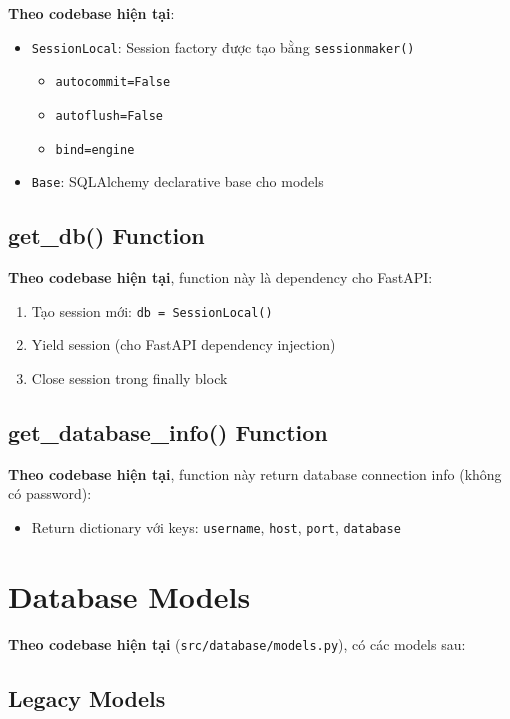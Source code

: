 \textbf{Theo codebase hiện tại}:
\begin{itemize}
    \item \texttt{SessionLocal}: Session factory được tạo bằng \texttt{sessionmaker()}
    \begin{itemize}
        \item \texttt{autocommit=False}
        \item \texttt{autoflush=False}
        \item \texttt{bind=engine}
    \end{itemize}
    \item \texttt{Base}: SQLAlchemy declarative base cho models
\end{itemize}

\subsection{get\_db() Function}

\textbf{Theo codebase hiện tại}, function này là dependency cho FastAPI:
\begin{enumerate}
    \item Tạo session mới: \texttt{db = SessionLocal()}
    \item Yield session (cho FastAPI dependency injection)
    \item Close session trong finally block
\end{enumerate}

\subsection{get\_database\_info() Function}

\textbf{Theo codebase hiện tại}, function này return database connection info (không có password):
\begin{itemize}
    \item Return dictionary với keys: \texttt{username}, \texttt{host}, \texttt{port}, \texttt{database}
\end{itemize}

\section{Database Models}

\textbf{Theo codebase hiện tại} (\texttt{src/database/models.py}), có các models sau:

\subsection{Legacy Models}


